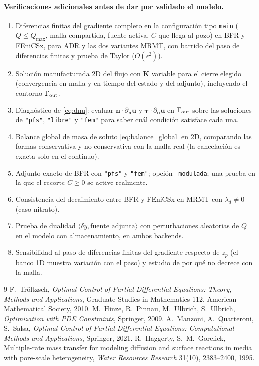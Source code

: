 \documentclass[11pt]{article}
\numberwithin{equation}{section}
\theoremstyle{plain}
\theoremstyle{definition}
\theoremstyle{remark}
\newcommand{\bu}{\mathbf{u}}
\newcommand{\bK}{\mathbf{K}}
\newcommand{\bn}{\mathbf{n}}
\begin{document}
\paragraph{Verificaciones adicionales antes de dar por validado el modelo.}
\begin{enumerate}[label=\textbf{E\arabic*.},nosep]
\item Diferencias finitas del gradiente completo en la configuración tipo \texttt{main} ($Q\le Q_{\max}$, malla compartida, fuente activa, $C$ que llega al pozo) en BFR y FEniCSx, para ADR y las dos variantes MRMT, con barrido del paso de diferencias finitas y prueba de Taylor ($O(\epsilon^2)$).
\item Solución manufacturada 2D del flujo con $\bK$ variable para el cierre elegido (convergencia en malla y en tiempo del estado y del adjunto), incluyendo el contorno $\Gamma_{\rm out}$.
\item Diagnóstico de \eqref{eq:dnu}: evaluar $\bn\cdot\partial_{\bn}\bu$ y $\boldsymbol\tau\cdot\partial_{\bn}\bu$ en $\Gamma_{\rm out}$ sobre las soluciones de \texttt{"pfs"}, \texttt{"libre"} y \texttt{"fem"} para saber cuál condición satisface cada una.
\item Balance global de masa de soluto \eqref{eq:balance_global} en 2D, comparando las formas conservativa y no conservativa con la malla real (la cancelación es exacta solo en el continuo).
\item Adjunto exacto de BFR con \texttt{"pfs"} y \texttt{"fem"}; opción \texttt{--modulada}; una prueba en la que el recorte $C\ge0$ se active realmente.
\item Consistencia del decaimiento entre BFR y FEniCSx en MRMT con $\lambda_d\ne0$ (caso nitrato).
\item Prueba de dualidad $\langle\delta y,\text{fuente adjunta}\rangle$ con perturbaciones aleatorias de $Q$ en el modelo con almacenamiento, en ambos backends.
\item Sensibilidad al paso de diferencias finitas del gradiente respecto de $z_p$ (el banco 1D muestra variación con el paso) y estudio de por qué no decrece con la malla.
\end{enumerate}

\begin{thebibliography}{9}
 F.~Tröltzsch, \emph{Optimal Control of Partial Differential Equations: Theory, Methods and Applications},
  Graduate Studies in Mathematics 112, American Mathematical Society, 2010.
 M.~Hinze, R.~Pinnau, M.~Ulbrich, S.~Ulbrich, \emph{Optimization with PDE Constraints}, Springer, 2009.
 A.~Manzoni, A.~Quarteroni, S.~Salsa, \emph{Optimal Control of Partial Differential Equations:
  Computational Methods and Applications}, Springer, 2021.
 R.~Haggerty, S.~M.~Gorelick, Multiple-rate mass transfer for modeling diffusion and surface
  reactions in media with pore-scale heterogeneity, \emph{Water Resources Research} 31(10), 2383--2400, 1995.
\end{thebibliography}
\end{document}
